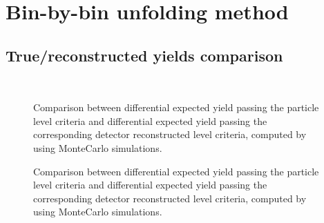 \chapter{Bin-by-bin unfolding method}
\section{True/reconstructed yields comparison }
\begin{figure}[h]
 \\
\caption{Comparison between differential expected yield passing the particle level criteria and differential expected yield passing the corresponding detector reconstructed level criteria, computed by using MonteCarlo simulations.}
\end{figure}
\begin{figure}[t]
\centering
{}
\caption{Comparison between differential expected yield passing the particle level criteria and differential expected yield passing the corresponding detector reconstructed level criteria, computed by using MonteCarlo simulations.}
\end{figure}

